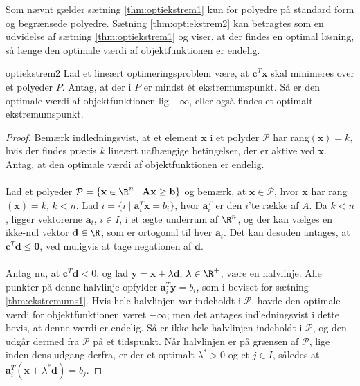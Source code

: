 %
%
%
Som nævnt gælder sætning \ref{thm:optiekstrem1} kun for polyedre på standard form og begrænsede polyedre. 
Sætning \ref{thm:optiekstrem2} kan betragtes som en udvidelse af sætning \ref{thm:optiekstrem1} og viser, at der findes en optimal løsning, så længe den optimale værdi af objektfunktionen er endelig. 
%
\begin{thm}{}{optiekstrem2}
Lad et lineært optimeringsproblem være, at $\textbf{c}^T \textbf{x}$ skal minimeres over et polyeder $P$. 
Antag, at der i $P$ er mindst ét ekstremumspunkt. 
Så er den optimale værdi af objektfunktionen lig $- \infty$, eller også findes et optimalt ekstremumspunkt. 
\end{thm}
%
\begin{proof}
Bemærk indledningsvist, at et element $\textbf{x}$ i et polyder $\mathcal{P}$ har rang$(\textbf{x})=k$, hvis der findes præcis $k$ lineært uafhængige betingelser, der er aktive ved $\textbf{x}$. 
Antag, at den optimale værdi af objektfunktionen er endelig. 
\\\\
%
Lad et polyeder $\mathcal{P} = \{\textbf{x} \in \R^n \mid \textbf{A}\textbf{x} \geq \textbf{b} \}$ og bemærk, at $\textbf{x} \in \mathcal{P}$, hvor $\textbf{x}$ har rang$(\textbf{x})=k$, $k < n$. 
Lad $i = \{ i \mid \textbf{a}^T_i \textbf{x} = b_i \}$, hvor $\textbf{a}^T_i$ er den $i$'te række af $A$. 
Da $k < n$, ligger vektorerne $\textbf{a}_i$, $i \in I$, i et ægte underrum af $ \R^n$, og der kan vælges en ikke-nul vektor $\textbf{d} \in \R$, som er ortogonal til hver $\textbf{a}_i$. 
Det kan desuden antages, at $\textbf{c}^T \textbf{d} \leq \textbf{0}$, ved muligvis at tage negationen af $\textbf{d}$. 
\\\\
%
Antag nu, at $\textbf{c}^T \textbf{d} < 0$, og lad $\textbf{y} = \textbf{x} + \lambda \textbf{d}$, $ \lambda \in \R^+$, være en halvlinje. 
Alle punkter på denne halvlinje opfylder $\textbf{a}^T_i \textbf{y} = b_i$, som i beviset for sætning \ref{thm:ekstremums1}. 
Hvis hele halvlinjen var indeholdt i $\mathcal{P}$, havde den optimale værdi for objektfunktionen været $- \infty $; men det antages indledningsvist i dette bevis, at denne værdi er endelig. 
Så er ikke hele halvlinjen indeholdt i $\mathcal{P}$, og den udgår dermed fra $\mathcal{P}$ på et tidspunkt. 
Når halvlinjen er på grænsen af $\mathcal{P}$, lige inden dens udgang derfra, er der et optimalt $ \lambda^* > 0$ og et $j \in I$, således at $\textbf{a}^T_i (\textbf{x} + \lambda^* \textbf{d} ) = b_j $.

\end{proof}
